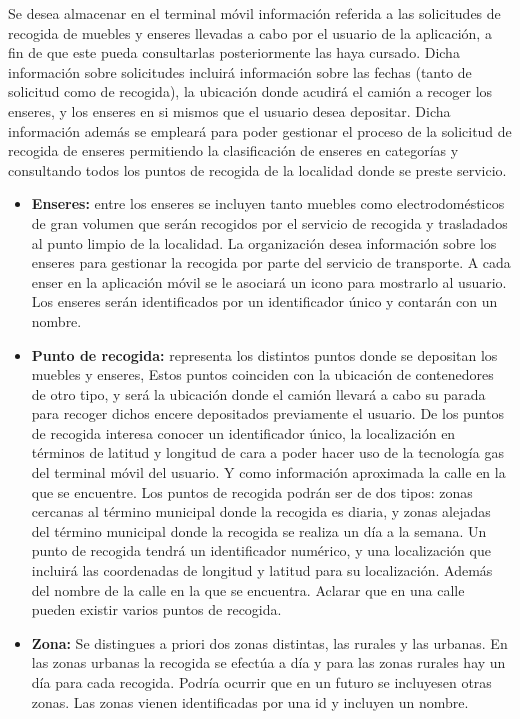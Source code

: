 Se desea almacenar en el terminal móvil información referida a las solicitudes de recogida de muebles y enseres llevadas a cabo por el usuario de la aplicación, a fin de que este pueda consultarlas posteriormente las haya cursado. Dicha información sobre solicitudes incluirá información sobre las fechas (tanto de solicitud como de recogida), la ubicación donde acudirá el camión a recoger los enseres, y los enseres en si mismos que el usuario desea depositar. Dicha información además se empleará para poder gestionar el proceso de la solicitud de recogida de enseres permitiendo la clasificación de enseres en categorías y consultando todos los puntos de recogida de la localidad donde se preste servicio. \\
\begin{itemize}

\item \textbf{Enseres: }entre los enseres se incluyen tanto muebles como electrodomésticos de gran volumen que serán recogidos por el servicio de recogida y trasladados al punto limpio de la localidad. La organización desea información sobre los enseres para gestionar la recogida por parte del servicio de transporte. A cada enser en la aplicación móvil se le asociará un icono para mostrarlo al usuario. Los enseres serán identificados por un identificador único y contarán con un nombre.

\item \textbf{Punto de recogida: }representa los distintos puntos donde se depositan los muebles y enseres, Estos puntos coinciden con la ubicación de contenedores de otro tipo, y será la ubicación donde el camión llevará a cabo su parada para recoger dichos encere depositados previamente el usuario. De los puntos de recogida interesa conocer un identificador único, la localización en términos de latitud y longitud de cara a poder hacer uso de la tecnología gas del terminal móvil del usuario. Y como información aproximada la calle en la que se encuentre. Los puntos de recogida podrán ser de dos tipos: zonas cercanas al término municipal donde la recogida es diaria, y zonas alejadas del término municipal donde la recogida se realiza un día a la semana. Un punto de recogida tendrá un identificador numérico, y una localización que incluirá las coordenadas de longitud y latitud para su localización. Además del nombre de la calle en la que se encuentra. Aclarar que en una calle pueden existir varios puntos de recogida.

\item \textbf{Zona: }Se distingues a priori dos zonas distintas, las rurales y las urbanas. En las zonas urbanas la recogida se efectúa a día y para las zonas rurales hay un día para cada recogida. Podría ocurrir que en un futuro se incluyesen otras zonas. Las zonas vienen identificadas por una id y incluyen un nombre.


\end{itemize}
